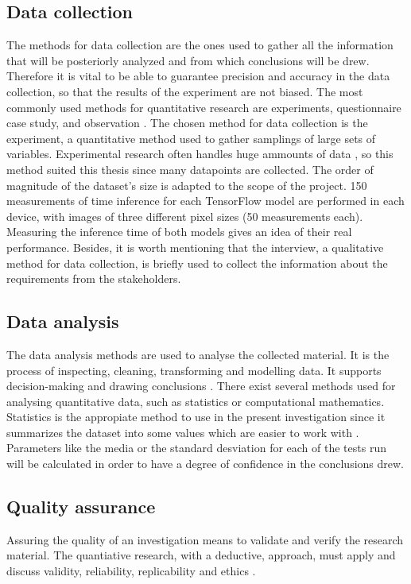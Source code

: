 \subsection{Data collection}
The methods for data collection are the ones used to gather all the information that will be posteriorly analyzed and from which conclusions will be drew. Therefore it is vital to be able to guarantee precision and accuracy in the data collection, so that the results of the experiment are not biased. The most commonly used methods for quantitative research are experiments, questionnaire case study, and observation \cite{haakansson}. The chosen method for data collection is the experiment, a quantitative method used to gather samplings of large sets of variables. Experimental research often handles huge ammounts of data \cite{burns2000introduction}, so this method suited this thesis since many datapoints are collected. The order of magnitude of the dataset's size is adapted to the scope of the project. 150 measurements of time inference for each TensorFlow model are performed in each device, with images of three different pixel sizes (50 measurements each). Measuring the inference time of both models gives an idea of their real performance. Besides, it is worth mentioning that the interview, a qualitative method for data collection, is briefly used to collect the information about the requirements from the stakeholders.

\subsection{Data analysis}
The data analysis methods are used to analyse the collected material. It is the process of inspecting, cleaning, transforming and modelling data. It supports decision-making and drawing conclusions \cite{haakansson}. There exist several methods used for analysing quantitative data, such as statistics or computational mathematics. Statistics is the appropiate method to use in the present investigation since it summarizes the dataset into some values which are easier to work with \cite{burns2000introduction}. Parameters like the media or the standard desviation for each of the tests run will be calculated in order to have a degree of confidence in the conclusions drew.	

\subsection{Quality assurance}
Assuring the quality of an investigation means to validate and verify the research material. The quantiative research, with a deductive, approach, must apply and discuss validity, reliability, replicability and ethics \cite{haakansson} \cite{salkind} \cite{saunders}. \\

